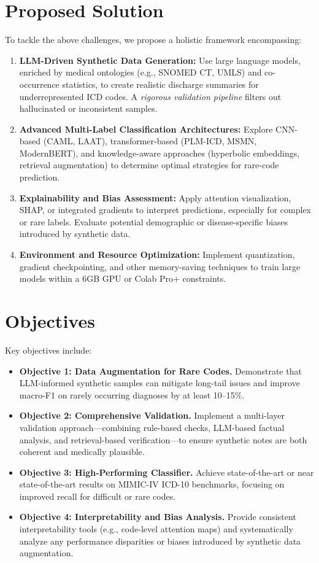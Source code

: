 \documentclass[12pt,a4paper]{report}
\begin{document}
\section{Proposed Solution}
To tackle the above challenges, we propose a holistic framework encompassing:
\begin{enumerate}
    \item \textbf{LLM-Driven Synthetic Data Generation:} Use large language models, enriched by medical ontologies (e.g., SNOMED CT, UMLS) and co-occurrence statistics, to create realistic discharge summaries for underrepresented ICD codes. A \emph{rigorous validation pipeline} filters out hallucinated or inconsistent samples.
    \item \textbf{Advanced Multi-Label Classification Architectures:} Explore CNN-based (CAML, LAAT), transformer-based (PLM-ICD, MSMN, ModernBERT), and knowledge-aware approaches (hyperbolic embeddings, retrieval augmentation) to determine optimal strategies for rare-code prediction.
    \item \textbf{Explainability and Bias Assessment:} Apply attention visualization, SHAP, or integrated gradients to interpret predictions, especially for complex or rare labels. Evaluate potential demographic or disease-specific biases introduced by synthetic data.
    \item \textbf{Environment and Resource Optimization:} Implement quantization, gradient checkpointing, and other memory-saving techniques to train large models within a 6GB GPU or Colab Pro+ constraints.
\end{enumerate}

\section{Objectives}
Key objectives include:
\begin{itemize}
    \item \textbf{Objective 1: Data Augmentation for Rare Codes.} Demonstrate that LLM-informed synthetic samples can mitigate long-tail issues and improve macro-F1 on rarely occurring diagnoses by at least 10--15\%.
    \item \textbf{Objective 2: Comprehensive Validation.} Implement a multi-layer validation approach—combining rule-based checks, LLM-based factual analysis, and retrieval-based verification—to ensure synthetic notes are both coherent and medically plausible.
    \item \textbf{Objective 3: High-Performing Classifier.} Achieve state-of-the-art or near state-of-the-art results on MIMIC-IV ICD-10 benchmarks, focusing on improved recall for difficult or rare codes.
    \item \textbf{Objective 4: Interpretability and Bias Analysis.} Provide consistent interpretability tools (e.g., code-level attention maps) and systematically analyze any performance disparities or biases introduced by synthetic data augmentation.
\end{itemize}
\end{document}
